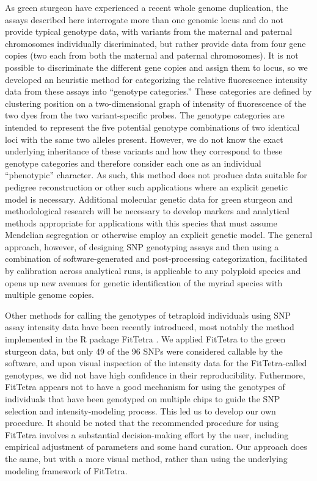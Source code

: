 As green sturgeon have experienced a recent whole genome duplication, the assays described here 
interrogate more than one genomic locus and do not provide typical genotype data, 
with variants from the maternal and paternal chromosomes individually discriminated, 
but rather provide data from four gene copies (two each from both the maternal and 
paternal chromosomes). It is not possible to discriminate the different gene copies 
and assign them to locus, so we developed an heuristic method for categorizing the 
relative fluorescence intensity data from these assays into ``genotype categories.'' 
These categories are defined by clustering position on a two-dimensional graph of 
intensity of fluorescence of the two dyes from the two 
variant-specific probes. The genotype categories are intended to represent the 
five potential genotype combinations of two identical loci with the same two alleles 
present. However, we do not know the exact underlying inheritance of these variants 
and how they correspond to these genotype categories and therefore consider each 
one as an individual ``phenotypic'' character. As such, this method does not produce 
data suitable for pedigree reconstruction or other such applications where an explicit 
genetic model is necessary. Additional molecular genetic data for green sturgeon and 
methodological research will be necessary to develop markers and analytical methods 
appropriate for applications with this species that must assume Mendelian segregation 
or otherwise employ an explicit genetic model. The general approach, however, of designing 
SNP genotyping assays and then using a combination of software-generated and 
post-processing categorization, facilitated by calibration across analytical runs, 
is applicable to any polyploid species and opens up new avenues for genetic 
identification of the myriad species with multiple genome copies.

Other methods for calling the genotypes 
of tetraploid individuals using SNP assay intensity data have been recently
introduced, most notably the method implemented in the R package {\sc FitTetra} 
\citep{voorrips2011genotype}.   We applied {\sc FitTetra} to the green sturgeon data, 
but only 49 of the 96
SNPs were considered callable by the software, and upon visual inspection of the
intensity data for the {\sc FitTetra}-called genotypes, we did not have high confidence in their reproducibility. 
Futhermore, {\sc FitTetra} appears not to have a good 
mechanism for using the genotypes of individuals that have been genotyped on multiple chips to guide
the SNP selection and intensity-modeling process.  This led us to develop
our own procedure.  
It should be noted that the recommended procedure for using {\sc FitTetra} involves a 
substantial decision-making effort by the user, including empirical 
adjustment of parameters and some hand curation. Our approach does the same, but with a more visual
method, rather than using the underlying modeling framework of {\sc FitTetra}.



